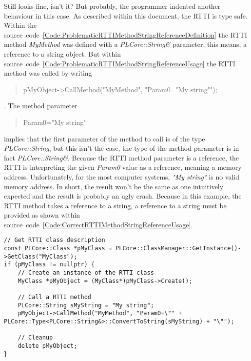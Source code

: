 Still looks fine, isn't it? But probably, the programmer indented another behaviour in this case. As described within this document, the RTTI is type safe. Within the source~code~\ref{Code:ProblematicRTTIMethodStringReferenceDefinition} the RTTI method \emph{MyMethod} was defined with a \emph{PLCore::String\&} parameter, this means, a reference to a string object. But within source~code~\ref{Code:ProblematicRTTIMethodStringReferenceUsage} the RTTI method was called by writing \begin{quote}pMyObject->CallMethod("MyMethod", "Param0="My string"");\end{quote}. The method parameter \begin{quote}Param0="My string"\end{quote} implies that the first parameter of the method to call is of the type \emph{PLCore::String}, but this isn't the case, the type of the method parameter is in fact \emph{PLCore::String\&}. Because the RTTI method parameter is a reference, the RTTI is interpreting the given \emph{Param0} value as a reference, meaning a memory address. Unfortunately, for the most computer systems, \emph{"My string"} is no valid memory address. In short, the result won't be the same as one intuitively expected and the result is probably an ugly crash. Because in this example, the RTTI method takes a reference to a string, a reference to a string must be provided as shown within source~code~\ref{Code:CorrectRTTIMethodStringReferenceUsage}.
\begin{lstlisting}[label=Code:CorrectRTTIMethodStringReferenceUsage,caption={Correct RTTI method and string reference parameter usage}]
// Get RTTI class description
const PLCore::Class *pMyClass = PLCore::ClassManager::GetInstance()->GetClass("MyClass");
if (pMyClass != nullptr) {
	// Create an instance of the RTTI class
	MyClass *pMyObject = (MyClass*)pMyClass->Create();

	// Call a RTTI method
	PLCore::String sMyString = "My string";
	pMyObject->CallMethod("MyMethod", "Param0=\"" + PLCore::Type<PLCore::String&>::ConvertToString(sMyString) + "\"");

	// Cleanup
	delete pMyObject;
}
\end{lstlisting}
